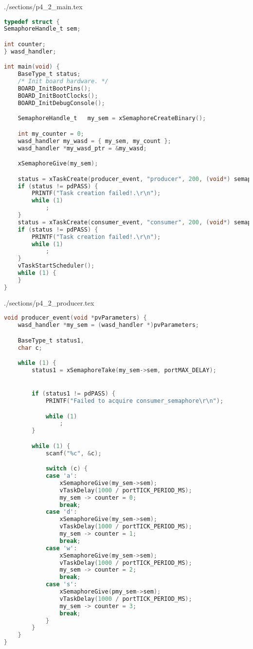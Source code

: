 \begin{filecontents}[overwrite]{./sections/p4_2_main.tex}
\begin{lstlisting}[language=c,caption=Problem 4.2 main, label=list:p4_2_main]
typedef struct {
SemaphoreHandle_t sem;

int counter;
} wasd_handler;

int main(void) {
    BaseType_t status;
    /* Init board hardware. */
    BOARD_InitBootPins();
    BOARD_InitBootClocks();
    BOARD_InitDebugConsole();

    SemaphoreHandle_t	my_sem = xSemaphoreCreateBinary();

    int my_counter = 0;
    wasd_handler my_wasd = { my_sem, my_count };
    wasd_handler *my_wasd_ptr = &my_wasd;

    xSemaphoreGive(my_sem);

    status = xTaskCreate(producer_event, "producer", 200, (void*) semaphores, 2, NULL);
    if (status != pdPASS) {
        PRINTF("Task creation failed!.\r\n");
        while (1)
            ;
    }
    status = xTaskCreate(consumer_event, "consumer", 200, (void*) semaphores, 2, NULL);
    if (status != pdPASS) {
        PRINTF("Task creation failed!.\r\n");
        while (1)
            ;
    }
    vTaskStartScheduler();
    while (1) {
    }
}
\end{lstlisting}
\end{filecontents}

\begin{filecontents}[overwrite]{./sections/p4_2_producer.tex}
\begin{lstlisting}[language=c,caption=Problem 4.2 Producer Task, label=list:p4_2_prod]
void producer_event(void *pvParameters) {
    wasd_handler *my_sem = (wasd_handler *)pvParameters;

    BaseType_t status1,
    char c;

    while (1) {
        status1 = xSemaphoreTake(my_sem->sem, portMAX_DELAY);


        if (status1 != pdPASS) {
            PRINTF("Failed to acquire consumer_semaphore\r\n");

            while (1)
                ;
        }

        while (1) {
            scanf("%c", &c);

            switch (c) {
            case 'a':
                xSemaphoreGive(my_sem->sem);
                vTaskDelay(1000 / portTICK_PERIOD_MS);
                my_sem -> counter = 0;
                break;
            case 'd':
                xSemaphoreGive(my_sem->sem);
                vTaskDelay(1000 / portTICK_PERIOD_MS);
                my_sem -> counter = 1;
                break;
            case 'w':
                xSemaphoreGive(my_sem->sem);
                vTaskDelay(1000 / portTICK_PERIOD_MS);
                my_sem -> counter = 2;
                break;
            case 's':
                xSemaphoreGive(pmy_sem->sem);
                vTaskDelay(1000 / portTICK_PERIOD_MS);
                my_sem -> counter = 3;
                break;
            }
        }
    }
}
\end{lstlisting}
\end{filecontents}

